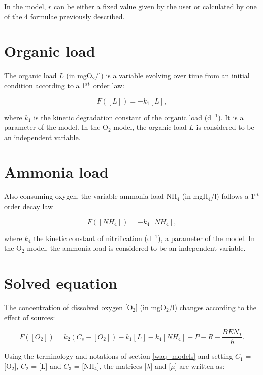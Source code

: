 In the model, $r$ can be either a fixed value given by the user or
calculated by one of the 4 formulae previously described.\\

\section{Organic load}

The organic load $L$ (in mgO$_2$/l) is a variable evolving over time
from an initial condition according to a 1$^{\rm{st}}$ order law:

\begin{equation}
  F([L]) = -k_1 [L],
\end{equation}

where $k_1$ is the kinetic degradation constant of the organic load (d$^{-1}$).
It is a parameter of the model.
In the O$_2$ model, the organic load $L$ is considered to be an independent variable.

\section{Ammonia load}

Also consuming oxygen, the variable ammonia load NH$_4$ (in mgH$_4$/l) follows
a 1$^{\rm{st}}$ order decay law

\begin{equation}
  F([NH_4]) = -k_4 [NH_4],
\end{equation}

where $k_4$ the kinetic constant of nitrification (d$^{-1}$),
a parameter of the model.
In the O$_2$ model, the ammonia load is considered to be an independent variable.\\

\section{Solved equation}

The concentration of dissolved oxygen [O$_2$] (in mgO$_2$/l) changes
according to the effect of sources:

\begin{equation}
  F([O_2]) = k_2 (C_s - [O_2]) -k_1 [L] - k_4 [NH_4] + P - R - \frac{BEN_T}{h}.
\end{equation}

Using the terminology and notations of section \ref{waq_models}
and setting $C_1$ = [O$_2$], $C_2$ = [L] and $C_3$ = [NH$_4$],
the matrices [$ \lambda $] and [$ \mu $]
are written as:\\


